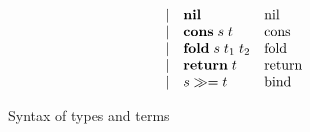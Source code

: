 \begin{figure}
\begin{subfigure}[t]{0.48\linewidth}
\[\begin{array}{lllll}
    \\
    && \mid &
    \mathbf{nil}
    &
    \text{nil}
    \\
    && \mid &
    \mathbf{cons}\;s\;t
    &
    \text{cons}
    \\
    && \mid &
    \mathbf{fold}\;s\;t_1\;t_2
    &
    \text{fold}
    \\
    && \mid &
    \mathbf{return}\;t
    &
    \text{return}
    \\
    && \mid &
    {s}\gg={t}
    &
    \text{bind}
  \end{array}
  \]
  \end{subfigure}
  \caption{Syntax of types and terms}
  \label{fig:syntax}
\end{figure}
